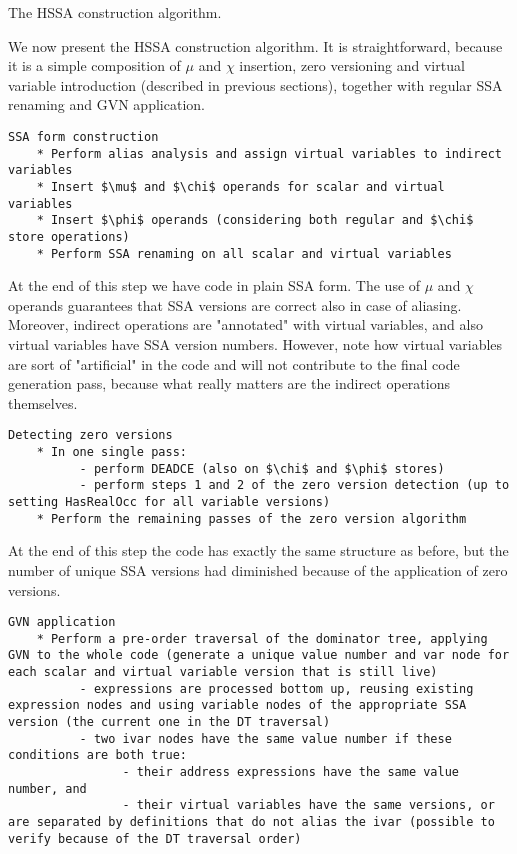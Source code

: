 The HSSA construction algorithm.

We now present the HSSA construction algorithm.
It is straightforward, because it is a simple composition of $\mu$ and $\chi$ insertion, zero versioning and virtual variable introduction (described in previous sections), together with regular SSA renaming and GVN application.


\begin{verbatim}
SSA form construction
    * Perform alias analysis and assign virtual variables to indirect variables
    * Insert $\mu$ and $\chi$ operands for scalar and virtual variables
    * Insert $\phi$ operands (considering both regular and $\chi$ store operations)
    * Perform SSA renaming on all scalar and virtual variables
\end{verbatim}

At the end of this step we have code in plain SSA form.
The use of $\mu$ and $\chi$ operands guarantees that SSA versions are correct also in case of aliasing.
Moreover, indirect operations are "annotated" with virtual variables, and also virtual variables have SSA version numbers.
However, note how virtual variables are sort of "artificial" in the code and will not contribute to the final code generation pass, because what really matters are the indirect operations themselves.

\begin{verbatim}
Detecting zero versions
    * In one single pass:
          - perform DEADCE (also on $\chi$ and $\phi$ stores)
          - perform steps 1 and 2 of the zero version detection (up to setting HasRealOcc for all variable versions)
    * Perform the remaining passes of the zero version algorithm
\end{verbatim}

At the end of this step the code has exactly the same structure as before, but the number of unique SSA versions had diminished because of the application of zero versions.

\begin{verbatim}
GVN application
    * Perform a pre-order traversal of the dominator tree, applying GVN to the whole code (generate a unique value number and var node for each scalar and virtual variable version that is still live)
          - expressions are processed bottom up, reusing existing expression nodes and using variable nodes of the appropriate SSA version (the current one in the DT traversal)
          - two ivar nodes have the same value number if these conditions are both true:
                - their address expressions have the same value number, and
                - their virtual variables have the same versions, or are separated by definitions that do not alias the ivar (possible to verify because of the DT traversal order)
\end{verbatim}

